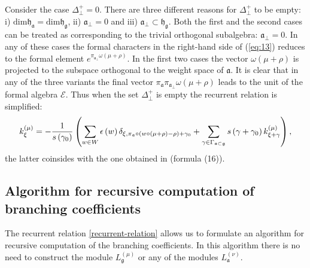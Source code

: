 \documentclass[12pt]{iopart}
\begin{document}
Consider the case  $\Delta_{\bot}^{+} = 0$. There are three different reasons for $\Delta_{\bot}^{+}$ to be empty: i) $\mathrm{dim}\mathfrak{h}_{\mathfrak{a}}=\mathrm{dim}\mathfrak{h}_{\mathfrak{g}}$, ii) $\mathfrak{a}_{\bot}=0$ and iii) $\mathfrak{a}_{\bot}\subset \mathfrak{h}_{\mathfrak{g}}$. Both the first and the second cases can be treated as corresponding to the trivial orthogonal subalgebra:
$\mathfrak{a}_{\bot}=0$. In any of these cases the formal characters in the right-hand side of (\ref{eq:13}) reduces to the formal element $e^{ \pi_{\mathfrak{a}_{\bot}}\omega(\mu+\rho)}$.
In the first two cases the vector $\omega(\mu+\rho)$ is projected to the subspace orthogonal to the weight space of $\mathfrak{a}$. It is clear that in any of the three variants the final vector $\pi_{\mathfrak{a}}\pi_{\mathfrak{a}_{\bot}}\omega(\mu+\rho)$ leads to the unit of the formal algebra
$\mathcal{E}$. Thus when the set $\Delta_{\bot}^{+}$ is empty the  recurrent relation is simplified:
\begin{equation}
k_{\xi }^{\left( \mu \right) }=-\frac{1}{s\left( \gamma _{0}\right) }\left(
\sum_{w\in W}\epsilon \left( w\right) \delta _{\xi ,\pi _{\frak{a}}\circ
\left( w\circ (\mu +\rho )-\rho \right) +\gamma _{0}}+\sum_{\gamma \in
\Gamma _{\frak{a}\subset \frak{g}}}s\left( \gamma +\gamma _{0}\right) k_{\xi
+\gamma }^{\left( \mu \right) }\right),  \label{recurrent relation special}
\end{equation}
the latter coinsides with the one obtained in \cite{ilyin812pbc} (formula (16)).

\subsection{Algorithm for recursive computation of branching coefficients}
\label{sec:algorithm}

The recurrent relation \ref{recurrent-relation} allows us to formulate an algorithm for recursive computation of the branching coefficients. In this algorithm there is no need to  construct the module $L^{(\mu)}_{\mathfrak{g}}$ or any of the modules $L^{(\nu)}_{\mathfrak{a}}$.
\end{document}
